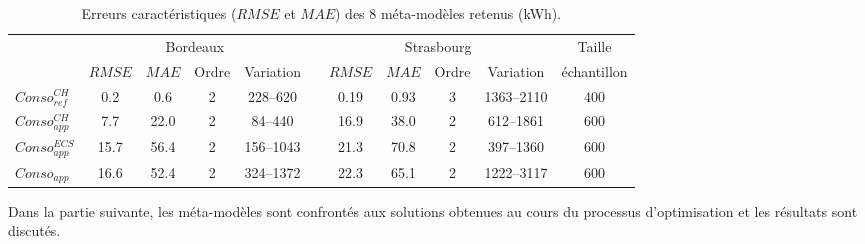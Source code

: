 \begin{table}
\centering
\caption[Erreurs caractéristiques des \num{8} méta-modèles retenus]
        {Erreurs caractéristiques ($RMSE$ et $MAE$) des \num{8} méta-modèles retenus (\si{kWh}).}
\label{tab:meta_result_bilan}
\begin{tabular}{l c c c c c c c c c c}
    \toprule
                    & \multicolumn{4}{c}{Bordeaux} & & \multicolumn{4}{c}{Strasbourg} &
                      Taille \\
                    \cmidrule(r){2-5}
                    \cmidrule(r){7-10}
                    & $RMSE$ & $MAE$  & Ordre & Variation  &       & $RMSE$ & $MAE$ & Ordre & Variation & échantillon \\
    \midrule
    $Conso_{ref}^{CH}$  & \num{0.2}  & \num{0.6}  & \num{2} & \numrange{228}{620}&   & \num{0.19}   & \num{0.93}  & \num{3}     & \numrange{1363}{2110}      & \num{400}  \\
    \addlinespace[\defaultaddspace]
    $Conso_{app}^{CH}$  & \num{7.7}  & \num{22.0} & \num{2} & \numrange{84}{440} &   & \num{16.9}   & \num{38.0}  & \num{2}     & \numrange{612}{1861}       & \num{600} \\
    \addlinespace[\defaultaddspace]
    $Conso_{app}^{ECS}$ & \num{15.7} & \num{56.4} & \num{2} & \numrange{156}{1043}&  & \num{21.3}   & \num{70.8}  & \num{2}     & \numrange{397}{1360}       & \num{600} \\
    \addlinespace[\defaultaddspace]
    $Conso_{app}$       & \num{16.6} & \num{52.4} & \num{2} & \numrange{324}{1372}&  & \num{22.3}   & \num{65.1}  & \num{2}     & \numrange{1222}{3117}       & \num{600} \\
    \bottomrule
\end{tabular}
\end{table}

Dans la partie suivante, les méta-modèles sont confrontés aux solutions obtenues
au cours du processus d’optimisation et les résultats sont discutés.



